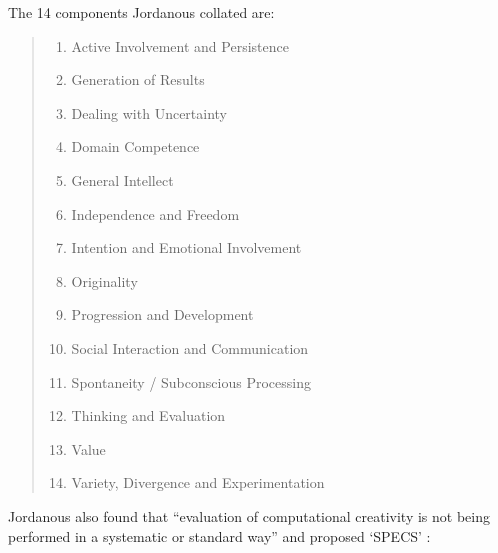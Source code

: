 The \num{14} components Jordanous collated are: \citeyear[p.118-120]{Jordanous2012}
\begin{quotation}
  \begin{enumerate}
    \item Active Involvement and Persistence
    \item Generation of Results
    \item Dealing with Uncertainty
    \item Domain Competence
    \item General Intellect
    \item Independence and Freedom
    \item Intention and Emotional Involvement
    \item Originality
    \item Progression and Development
    \item Social Interaction and Communication
    \item Spontaneity / Subconscious Processing
    \item Thinking and Evaluation
    \item Value
    \item Variety, Divergence and Experimentation
  \end{enumerate}
\end{quotation}

Jordanous also found that ``evaluation of computational creativity is not being performed in a systematic or standard way'' \citeyear[p.2]{Jordanous2011} and proposed `\ac{SPECS}' \citeyear[p.137-140]{Jordanous2012a}:

